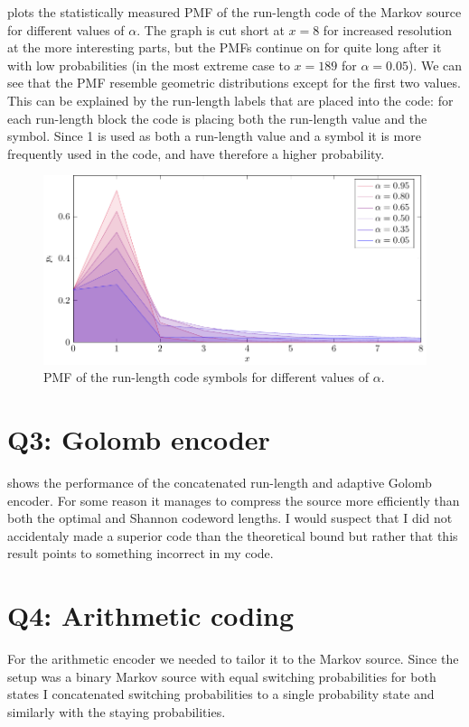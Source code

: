 \documentclass{article}
\begin{document}
 plots the statistically measured PMF of the run-length code of the Markov source
for different values of $\alpha$.
The graph is cut short at $x=8$ for increased resolution at the more interesting parts,
but the PMFs continue on for quite long after it with low probabilities
(in the most extreme case to $x=189$ for $\alpha=0.05$).
We can see that the PMF resemble geometric distributions except for the first two values.
This can be explained by the run-length labels that are placed into the code:
for each run-length block the code is placing both the run-length value and the symbol.
Since 1 is used as both a run-length value and a symbol it is more frequently used in the code,
and have therefore a higher probability.

\begin{figure}[!ht]
  \centering
  \includegraphics{../tikz/runlength_pmf/runlength_pmf.pdf}
  \caption{PMF of the run-length code symbols for different values of $\alpha$.}
  \label{fig:pmf}
\end{figure}

\section{Q3: Golomb encoder}
 shows the performance of the concatenated run-length and adaptive Golomb encoder.
For some reason it manages to compress the source more efficiently
than both the optimal and Shannon codeword lengths.
I would suspect that I did not accidentaly made a superior code than the theoretical bound
but rather that this result points to something incorrect in my code.

\section{Q4: Arithmetic coding}
For the arithmetic encoder we needed to tailor it to the Markov source.
Since the setup was a binary Markov source with equal switching probabilities for both states
I concatenated switching probabilities to a single probability state
and similarly with the staying probabilities.
\end{document}
